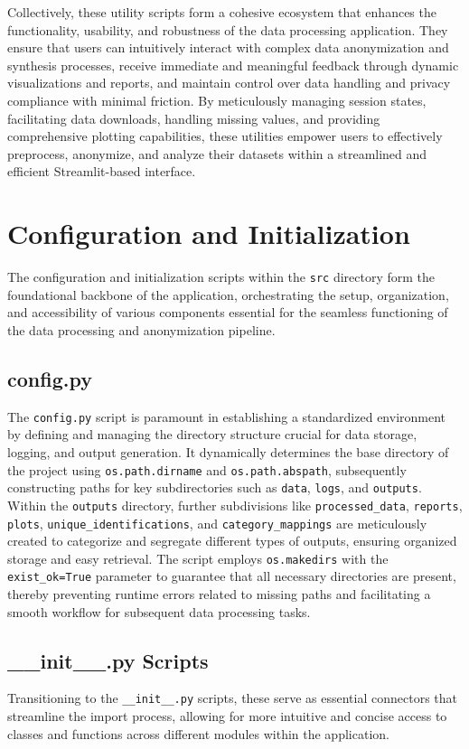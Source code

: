 \documentclass{article}
\begin{document}
Collectively, these utility scripts form a cohesive ecosystem that enhances the functionality, usability, and robustness of the data processing application. They ensure that users can intuitively interact with complex data anonymization and synthesis processes, receive immediate and meaningful feedback through dynamic visualizations and reports, and maintain control over data handling and privacy compliance with minimal friction. By meticulously managing session states, facilitating data downloads, handling missing values, and providing comprehensive plotting capabilities, these utilities empower users to effectively preprocess, anonymize, and analyze their datasets within a streamlined and efficient Streamlit-based interface.

\section*{Configuration and Initialization}
The configuration and initialization scripts within the \texttt{src} directory form the foundational backbone of the application, orchestrating the setup, organization, and accessibility of various components essential for the seamless functioning of the data processing and anonymization pipeline.

\subsection*{config.py}
The \texttt{config.py} script is paramount in establishing a standardized environment by defining and managing the directory structure crucial for data storage, logging, and output generation. It dynamically determines the base directory of the project using \texttt{os.path.dirname} and \texttt{os.path.abspath}, subsequently constructing paths for key subdirectories such as \texttt{data}, \texttt{logs}, and \texttt{outputs}. Within the \texttt{outputs} directory, further subdivisions like \texttt{processed\_data}, \texttt{reports}, \texttt{plots}, \texttt{unique\_identifications}, and \texttt{category\_mappings} are meticulously created to categorize and segregate different types of outputs, ensuring organized storage and easy retrieval. The script employs \texttt{os.makedirs} with the \texttt{exist\_ok=True} parameter to guarantee that all necessary directories are present, thereby preventing runtime errors related to missing paths and facilitating a smooth workflow for subsequent data processing tasks.

\subsection*{\_\_init\_\_.py Scripts}
Transitioning to the \texttt{\_\_init\_\_.py} scripts, these serve as essential connectors that streamline the import process, allowing for more intuitive and concise access to classes and functions across different modules within the application.
\end{document}
